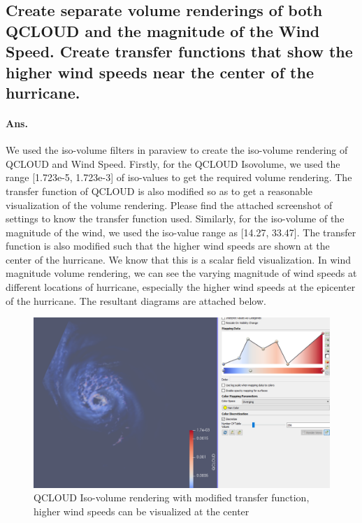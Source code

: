 \documentclass[a4paper,11pt]{article}
\theoremstyle{mytheor}
\begin{document}
\subsection{Create separate volume renderings of both QCLOUD and the magnitude of the
Wind Speed. Create transfer functions that show the higher wind speeds near the
center of the hurricane.}
\paragraph{Ans.} We used the iso-volume filters in paraview to create the iso-volume rendering of QCLOUD and Wind Speed. Firstly, for the QCLOUD Isovolume, we used the range [1.723e-5, 1.723e-3] of iso-values to get the required volume rendering. The transfer function of QCLOUD is also modified so as to get a reasonable visualization of the volume rendering. Please find the attached screenshot of settings to know the transfer function used. Similarly, for the iso-volume of the magnitude of the wind, we used the iso-value range as [14.27, 33.47]. The transfer function is also modified such that the higher wind speeds are shown at the center of the hurricane. We know that this is a scalar field visualization. In wind magnitude volume rendering, we can see the varying magnitude of wind speeds at different locations of hurricane, especially the higher wind speeds at the epicenter of the hurricane. The resultant diagrams are attached below. 

\begin{figure}[!h]
    \centering
    \includegraphics[scale=0.5]{Figures/P1_4_5.PNG}
    \caption{QCLOUD Iso-volume rendering with modified transfer function, higher wind speeds can be visualized at the center}
    \label{p1_3}
\end{figure}
\clearpage
\end{document}
